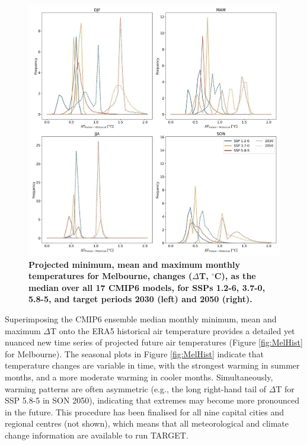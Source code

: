 \documentclass[utf8]{frontiersSCNS} %
\begin{document}
\begin{figure}
\centering
\includegraphics[trim={30 30 20 30},clip,scale=0.15]{images/image2.jpg}
\caption{\bf Projected minimum, mean and maximum monthly temperatures for Melbourne, changes ($\Delta$T, $^{\circ}$C), as the median over all 17 CMIP6 models, for SSPs 1.2-6, 3.7-0, 5.8-5, and target periods 2030 (left) and 2050 (right).}
 \label{fig:MelCmip}
\end{figure}

Superimposing the CMIP6 ensemble median monthly minimum, mean and maximum $\Delta$T onto the ERA5 historical air temperature provides a detailed yet nuanced new time series of projected future air temperatures (Figure \ref{fig:MelHist} for Melbourne).  The seasonal plots in Figure \ref{fig:MelHist} indicate that temperature changes are variable in time, with the strongest warming in summer months, and a more moderate warming in cooler months. Simultaneously, warming patterns are often asymmetric (e.g., the long right-hand tail of $\Delta$T for SSP 5.8-5 in SON 2050), indicating that extremes may become more pronounced in the future.
This procedure has been finalised for all nine capital cities and regional centres (not shown), which means that all meteorological and climate change information are available to run TARGET.
\end{document}
